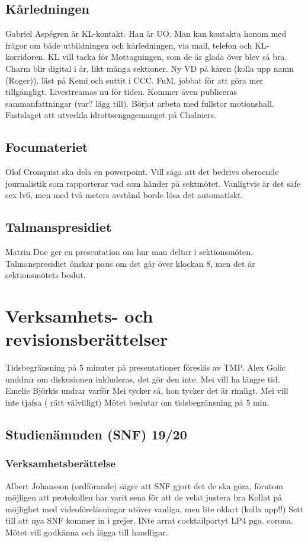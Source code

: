 \documentclass{sektionsmote}
\begin{document}
\subsection{Kårledningen}
Gabriel Aspégren är KL-kontakt. Han är UO.
Man kan kontakta honom med frågor om både utbildningen och kårledningen, via mail, telefon och KL-korridoren.
KL vill tacka för Mottagningen, som de är glada över blev så bra.
Charm blir digital i år, likt många sektioner.
Ny VD på kåren (kolla upp namn (Roger)), läst på Kemi och suttit i CCC.
FuM, jobbat för att göra mer tillgängligt. Livestreamas nu för tiden. Kommer även publiceras sammanfattningar (var? lägg till).
Börjat arbeta med fullstor motionshall.
Fastslaget att utveckla idrottsengagemanget på Chalmers.

\subsection{Focumateriet}
Olof Cronquist ska dela en powerpoint.
Vill säga att det bedrivs oberoende journalistik som rapporterar vad som händer på sektmötet.
Vanligtvis är det safe sex lv6, men med två meters avstånd borde lösa det automatiskt.

\subsection{Talmanspresidiet}
Matrin Due ger en presentation om hur man deltar i sektionsmöten.
Talmanspresidiet önskar paus om det går över klockan 8, men det är sektionsmötets beslut.


\section{Verksamhets- och revisionsberättelser}
Tidsbegränsning på 5 minuter på presentationer föresläs av TMP.
Alex Golic unddrar om diskusionen inkluderas, det gör den inte.
Mei vill ha längre tid.
Emelie Björkis undrar varför Mei tycker så, hon tycker det är rimligt.
Mei vill inte tjafsa ( rätt välvilligt)
Mötet beslutar om tidsbegränsning på 5 min.

\subsection{Studienämnden (SNF) 19/20}

\subsubsection{Verksamhetsberättelse}
Albert Johansson (ordförande) säger att SNF gjort det de ska göra, förutom möjligen att protokollen har varit sena för att de velat justera bra
Kollat på möjlighet med videoföreläsningar utöver vanliga, men lite oklart (kolla upp!!)
Sett till att nya SNF kommer in i grejer.
INte arrat cocktailpartyt LP4 pga. corona.
Mötet vill godkänna och lägga till handligar.
\end{document}
